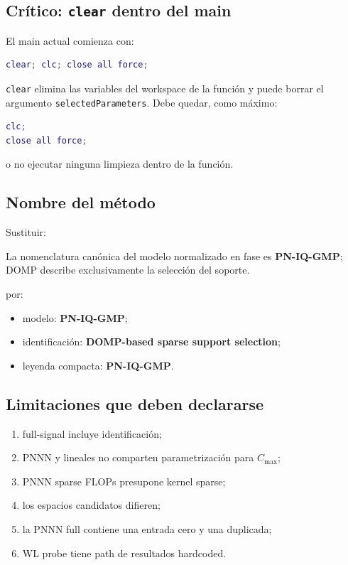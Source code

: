 \documentclass[10pt,a4paper]{article}
\newcommand{\code}[1]{\texttt{#1}}
\begin{document}
\subsection{Crítico: \code{clear} dentro del main}

El main actual comienza con:

\begin{lstlisting}[language=Matlab]
clear; clc; close all force;
\end{lstlisting}

\code{clear} elimina las variables del workspace de la función y puede borrar
el argumento \code{selectedParameters}. Debe quedar, como máximo:

\begin{lstlisting}[language=Matlab]
clc;
close all force;
\end{lstlisting}

o no ejecutar ninguna limpieza dentro de la función.

\subsection{Nombre del método}

Sustituir:

La nomenclatura canónica del modelo normalizado en fase es
\textbf{PN-IQ-GMP}; DOMP describe exclusivamente la selección del soporte.

por:

\begin{itemize}[leftmargin=*]
\item modelo: \textbf{PN-IQ-GMP};
\item identificación: \textbf{DOMP-based sparse support selection};
\item leyenda compacta: \textbf{PN-IQ-GMP}.
\end{itemize}

\subsection{Limitaciones que deben declararse}

\begin{enumerate}[leftmargin=*]
\item full-signal incluye identificación;
\item PNNN y lineales no comparten parametrización para \(C_{\max}\);
\item PNNN sparse FLOPs presupone kernel sparse;
\item los espacios candidatos difieren;
\item la PNNN full contiene una entrada cero y una duplicada;
\item WL probe tiene path de resultados hardcoded.
\end{enumerate}
\end{document}
